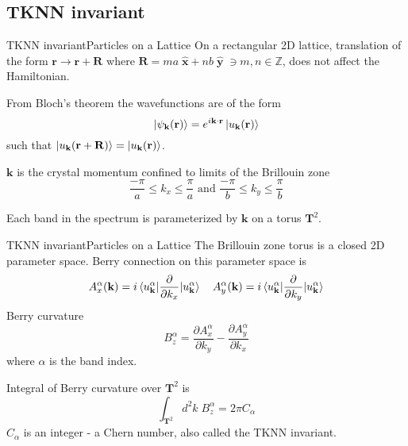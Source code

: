 \documentclass{beamer}
\begin{document}
\subsection{TKNN invariant}
\begin{frame}{TKNN invariant}{Particles on a Lattice}
On a rectangular 2D lattice, translation of the form $\mathbf{r} \rightarrow \mathbf{r}+\mathbf{R}$ where $\mathbf{R} = ma \;\hat{\mathbf{x}} + nb \;\hat{\mathbf{y}}\;\ni m,n\in\mathbb{Z}$,
does not affect the Hamiltonian.

From \alert{Bloch's theorem} the wavefunctions are of the form
\begin{equation}
 \ket{\psi_{\mathbf{k}}(\mathbf{r})} = e^{i\mathbf{k}\cdot\mathbf{r}} \ket{u_{\mathbf{k}}(\mathbf{r})}
\end{equation} such that $\ket{u_{\mathbf{k}}(\mathbf{r}+\mathbf{R})} = \ket{u_{\mathbf{k}}(\mathbf{r})}$.

$\mathbf{k}$ is the crystal momentum confined to limits of the Brillouin zone
\begin{equation*}
 \frac{-\pi}{a} \leq k_{x} \leq \frac{\pi}{a}\text{ and }\frac{-\pi}{b} \leq k_{y} \leq \frac{\pi}{b}
\end{equation*}

Each band in the spectrum is parameterized by $\mathbf{k}$ on a torus $\mathbf{T}^2$.
\end{frame}
\begin{frame}{TKNN invariant}{Particles on a Lattice}
\small The Brillouin zone torus is a closed 2D parameter space.
Berry connection on this parameter space is
\begin{equation}
 A_{x}^{\alpha}(\mathbf{k}) = i\braket{u_{\mathbf{k}}^{\alpha}|\frac{\partial}{\partial k_{x}}|u_{\mathbf{k}}^{\alpha}} \quad A_{y}^{\alpha}(\mathbf{k}) = i\braket{u_{\mathbf{k}}^{\alpha}|\frac{\partial}{\partial k_{y}}|u_{\mathbf{k}}^{\alpha}}
\end{equation}
Berry curvature 
\begin{equation}
 B_{z}^{\alpha} = \frac{\partial A_{x}^{\alpha}}{\partial k_{y}} - \frac{\partial A_{y}^{\alpha}}{\partial k_{x}}
\end{equation} where $\alpha$ is the band index.

Integral of Berry curvature over $\mathbf{T}^2$ is 
\begin{equation}
 \int_{\mathbf{T}^2}d^2k \;B_{z}^{\alpha} = 2\pi C_{\alpha}
\end{equation}
\alert{$C_{\alpha}$ is an integer - a Chern number}, also called the \alert{TKNN invariant}.\normalsize
\end{frame}
\end{document}
